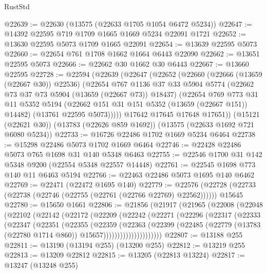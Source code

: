 \begin{lexlean}{RustStd}
\begin{coremodule}
@22639 := @22630 (@13575 (@22633 @1705 @1054 @6472 @5234))
@22647 := @14392 @22595 @719 @1709 @1665 @1669 @5234 @22091 @1721
@22652 := @13630 @22595 @5073 @1709 @1665 @22091
@22654 := @13639 @22595 @5073
@22660 := @22654 @761 @1708 @1662 @1664 @6443 @22090
@22662 := @13651 @22595 @5073
@22666 := @22662 @30 @1662 @30 @6443
@22667 := @13660 @22595
@22728 := @22594
    (@22639
      (@22647
        (@22652
          (@22660
            (@22666 (@13659 (@22667 @30)) @22536)
            (@22654
              @767
              @1136
              @37
              @33
              @5904
              @5774
              (@22662 @73 @37 @73 @5904 (@13659 (@22667 @73)) @18437)
              (@22654
                @769
                @773
                @31
                @11
                @5352
                @5194
                (@22662 @151 @31 @151 @5352 (@13659 (@22667 @151)) @14482)
                (@13761 @22595 @5073)))))
        @17642
        @17645
        @17648
        @17651))
    (@15121 (@22621 @30))
    (@13783 (@22626 @859 @1692))
    (@13575 (@22633 @1692 @721 @6080 @5234))
@22733 := @16726 @22486 @1702 @1669 @5234 @6464
@22738 := @15298 @22486 @5073 @1702 @1669 @6464
@22746 := @22428 @22486 @5073 @765 @1698 @31 @140 @5348 @6463
@22755 := @22546 @1700 @31 @142 @5348 @9200 (@22554 @5348 @22557 @14448)
@22761 := @22545 @1698 @773 @140 @11 @6463 @5194
@22766 := @22463 @22486 @5073 @1695 @140 @6462
@22769 := @22471 (@22472 @1695 @140)
@22779 := @22576 (@22728 (@22733 (@22738 (@22746 (@22755 (@22761 (@22766 @22769) @22562)))))) @15645
@22780 := @15650 @1661
@22806 := @21856
    (@21917
      (@21965
        (@22008
          (@22048
            (@22102
              (@22142
                (@22172
                  (@22209
                    (@22242
                      (@22271
                        (@22296
                          (@22317
                            (@22333
                              (@22347
                                (@22351
                                  (@22355
                                    (@22359
                                      (@22363
                                        (@22399
                                          (@22485
                                            (@22779
                                              (@13783 (@22780 @1714 @860))
                                              @15657)))))))))))))))))))))
@22807 := @13188 @255
@22811 := @13190 (@13194 @255) (@13200 @255)
@22812 := @13219 @255
@22813 := @13209 @22812
@22815 := @13205 (@22813 @13224)
@22817 := @13247 (@13248 @255)

\end{coremodule}
\end{lexlean}

